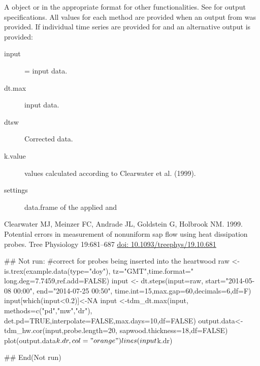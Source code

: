 \documentclass[a4paper]{book}
\begin{document}
\begin{Value}
A  object or  in the appropriate
format for other functionalities. See  for output specifications.
All  values for each method are provided when an output
from  was provided.
If individual time series are provided for  and  an alternative output is provided:

\begin{description}


\item[input] =  input data.
\item[dt.max]   input data.
\item[dtsw] Corrected  data.
\item[k.value]  values calculated according to Clearwater et al. (1999).
\item[settings] data.frame of the applied  and 


\end{description}

\end{Value}
%
\begin{References}\relax
Clearwater MJ, Meinzer FC, Andrade JL, Goldstein G, Holbrook NM. 1999.
Potential errors in measurement of nonuniform sap flow using heat dissipation probes.
Tree Physiology 19:681–687 \url{doi: 10.1093/treephys/19.10.681}
\end{References}
%
\begin{Examples}
\begin{ExampleCode}
## Not run: 
#correct for probes being inserted into the heartwood
raw   <-is.trex(example.data(type="doy"),
          tz="GMT",time.format="%
          long.deg=7.7459,ref.add=FALSE)
input <- dt.steps(input=raw,
                   start="2014-05-08 00:00",
                   end="2014-07-25 00:50",
                  time.int=15,max.gap=60,decimals=6,df=F)
input[which(input<0.2)]<-NA
input <-tdm_dt.max(input, methods=c("pd","mw","dr"),
                 det.pd=TRUE,interpolate=FALSE,max.days=10,df=FALSE)
output.data<-tdm_hw.cor(input,probe.length=20,
                   sapwood.thickness=18,df=FALSE)
plot(output.data$k.dr,col="orange")
lines(input$k.dr)

## End(Not run)

\end{ExampleCode}
\end{Examples}
\end{document}
